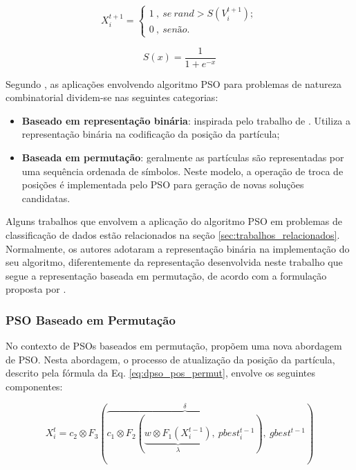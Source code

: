 \documentclass[
	12pt,				%
	openany,			%
	oneside,	
	a4paper,			%
	brazil,				%
	]{unimontes-ppgmsc-abntex2}
\begin{document}
\begin{equation}
\label{eq:dpso_pos_bin}
X^{t+1}_{i} = \left\{\begin{array}{l}
1\ ,\ se\ rand > S(V^{t+1}_{i}); \\
0\ ,\ senão.
\end{array}\right.
\end{equation}

\begin{equation}
\label{eq:dpso_sig}
S(x) = \frac{1}{1 + e^{-x}}
\end{equation}

Segundo , as aplicações envolvendo algoritmo PSO para problemas de natureza combinatorial dividem-se nas seguintes categorias: 

\begin{itemize}
\item \textbf{Baseado em representação binária}: inspirada pelo trabalho de . Utiliza a representação binária na codificação da posição da partícula;
\item \textbf{Baseada em permutação}: geralmente as partículas são representadas por uma sequência ordenada de símbolos. Neste modelo, a operação de troca de posições é implementada pelo PSO para geração de novas soluções candidatas.
\end{itemize}

Alguns trabalhos que envolvem a aplicação do algoritmo PSO em problemas de classificação de dados estão relacionados na seção \ref{sec:trabalhos_relacionados}. Normalmente, os autores adotaram a representação binária na implementação do seu algoritmo, diferentemente da representação desenvolvida neste trabalho que segue a representação baseada em permutação, de acordo com a formulação proposta por .

\subsubsection{PSO Baseado em Permutação}
\label{sec:atual_part}

No contexto de PSOs baseados em permutação,  propõem uma nova abordagem de PSO. Nesta abordagem, o processo de atualização da posição da partícula, descrito pela fórmula da Eq. \ref{eq:dpso_pos_permut}, envolve os seguintes componentes: 

\begin{equation}
\label{eq:dpso_pos_permut}
X^{t}_{i} = c_2 \otimes F_3 (\overbrace{c_1 \otimes F_2 (\underbrace{w \otimes F_1 (X^{t-1}_{i})}_{\lambda},\ pbest^{t-1}_{i})}^{\delta},\ 
gbest^{t-1})
\end{equation}
\end{document}
